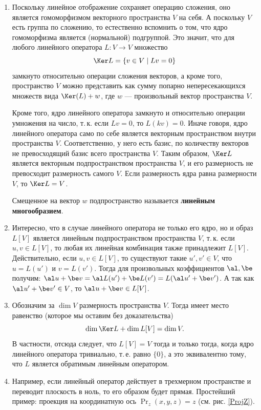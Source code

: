 \begin{enumerate}
\item Поскольку линейное отображение сохраняет операцию сложения, оно является гомоморфизмом векторного пространства $V$ на себя. А поскольку $V$ есть группа по сложению, то естественно вспомнить о том, что ядро гомоморфизма является (нормальной) подгруппой. Это значит, что для любого линейного оператора $L:V\to V$ множество
$$
\Ker L = \{v\in V\mid Lv=0\}
$$
замкнуто относительно операции сложения векторов, а кроме того, пространство $V$ можно представить как сумму попарно непересекающихся множеств вида $\Ker(L)+w$, где $w$ --- произвольный вектор пространства $V$.

Кроме того, ядро линейного оператора замкнуто и относительно операции умножения на число, т.\,к. если $Lv=0$, то $L(kv)=0$. Иначе говоря, ядро линейного оператора само по себе является векторным пространством внутри пространства $V$. Соответственно, у него есть базис, по количеству векторов не превосходящий базис всего пространства $V$. Таким образом, $\Ker L$ является векторным подпространством пространства $V$, и его размерность не превосходит размерность самого $V$. Если размерность ядра равна размерности $V$, то $\Ker L=V$.

Смещенное на вектор $w$ подпространство называется \textbf{линейным многообразием}.


\item Интересно, что в случае линейного оператора не только его ядро, но и образ $L[V]$ является линейным подпространством пространства $V$, т.\,к. если $u,v\in L[V]$, то любая их линейная комбинация также принадлежит $L[V]$. Действительно, если $u,v\in L[V]$, то существуют такие $u',v'\in V$, что $u=L(u')$ и $v=L(v')$. Тогда для произвольных коэффициентов $\al,\be$ получим: $\al u+\be v = \al L(u')+\be L(v')=L(\al u'+\be v')$. А так как $\al u'+\be v'\in V$, то $\al u+\be v \in L[V]$.

\item Обозначим за $\dim V$ размерность пространства $V$. Тогда имеет место равенство (которое мы оставим без доказательства)
$$
\dim \Ker L + \dim L[V] = \dim V.
$$
В частности, отсюда следует, что $L[V]=V$ тогда и только тогда, когда ядро линейного оператора тривиально, т.\,е. равно $\{0\}$, а это эквивалентно тому, что $L$ является обратимым линейным оператором.

\item Например, если линейный оператор действует в трехмерном пространстве и переводит плоскость в ноль, то его образом будет прямая. Простейший пример: проекция на координатную ось $\Pr_z(x,y,z) = z$ (см. рис. \ref{ProjZ}).


\end{enumerate}
